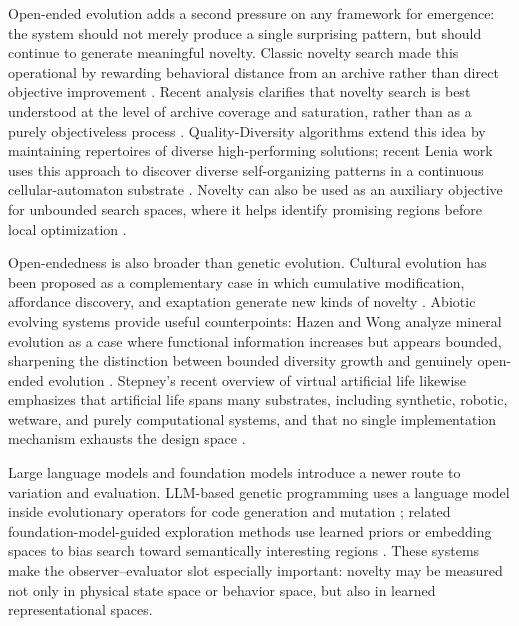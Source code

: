 \documentclass[journal]{IEEEtran}
\theoremstyle{plain}
\theoremstyle{definition}
\theoremstyle{plain}
\begin{document}
Open-ended evolution adds a second pressure on any framework for emergence:
the system should not merely produce a single surprising pattern, but should
continue to generate meaningful novelty. Classic novelty search made this
operational by rewarding behavioral distance from an archive rather than direct
objective improvement \cite{lehman2011novelty}. Recent analysis clarifies that
novelty search is best understood at the level of archive coverage and
saturation, rather than as a purely objectiveless process
\cite{wiegand2024simple}. Quality-Diversity algorithms extend this idea by
maintaining repertoires of diverse high-performing solutions; recent Lenia work
uses this approach to discover diverse self-organizing patterns in a continuous
cellular-automaton substrate \cite{faldor2024leniaqd}. Novelty can also be
used as an auxiliary objective for unbounded search spaces, where it helps
identify promising regions before local optimization \cite{ishizawa2025novelty}.

Open-endedness is also broader than genetic evolution. Cultural evolution has
been proposed as a complementary case in which cumulative modification,
affordance discovery, and exaptation generate new kinds of novelty
\cite{borg2024culturalopenendedness}. Abiotic evolving systems provide useful
counterpoints: Hazen and Wong analyze mineral evolution as a case where
functional information increases but appears bounded, sharpening the distinction
between bounded diversity growth and genuinely open-ended evolution
\cite{hazen2024bounded}. Stepney's recent overview of virtual artificial life
likewise emphasizes that artificial life spans many substrates, including
synthetic, robotic, wetware, and purely computational systems, and that no
single implementation mechanism exhausts the design space
\cite{stepney2025virtualalife}.

Large language models and foundation models introduce a newer route to
variation and evaluation. LLM-based genetic programming uses a language model
inside evolutionary operators for code generation and mutation
\cite{hemberg2024llmgp}; related foundation-model-guided exploration methods
use learned priors or embedding spaces to bias search toward semantically
interesting regions \cite{lehman2024large,kumar2024asal,faldor2024omniepic}.
These systems make the observer--evaluator slot especially important: novelty
may be measured not only in physical state space or behavior space, but also in
learned representational spaces.
\end{document}
